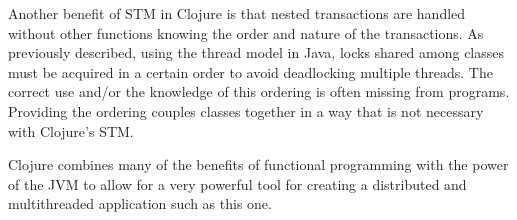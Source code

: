 Another benefit of STM in Clojure is that nested transactions are
handled without other functions knowing the order and nature of the
transactions. 
As previously described, using the thread model in Java, locks shared
among classes must be acquired in a certain order to avoid deadlocking
multiple threads. 
The correct use and/or the knowledge of this ordering is often missing
from programs. 
Providing the ordering couples classes together in a way that is not necessary with Clojure's STM.  

Clojure combines many of the benefits of functional programming with
the power of the JVM to allow for a very powerful tool for creating a
distributed and multithreaded application such as this one.
